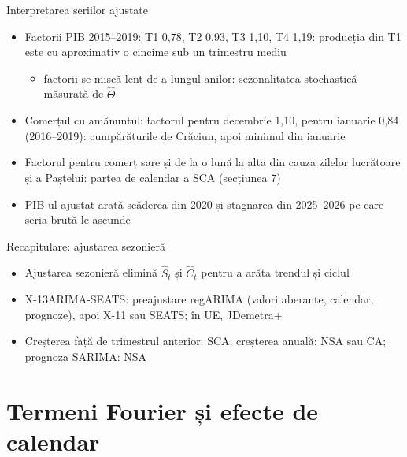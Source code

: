 \begin{frame}{Interpretarea seriilor ajustate}
\itemsize{\footnotesize}
\begin{itemize}
    \item Factorii PIB 2015--2019: T1 0{,}78, T2 0{,}93, T3 1{,}10, T4 1{,}19: producția din T1 este cu aproximativ o cincime sub un trimestru mediu
    \begin{itemize}
        \item factorii se mișcă lent de-a lungul anilor: sezonalitatea stochastică măsurată de $\hat\Theta$
    \end{itemize}
    \item Comerțul cu amănuntul: factorul pentru decembrie 1{,}10, pentru ianuarie 0{,}84 (2016--2019): cumpărăturile de Crăciun, apoi minimul din ianuarie
    \item Factorul pentru comerț sare și de la o lună la alta din cauza zilelor lucrătoare și a Paștelui: partea de calendar a SCA (secțiunea 7)
    \item PIB-ul ajustat arată scăderea din 2020 și stagnarea din 2025--2026 pe care seria brută le ascunde
\end{itemize}
\end{frame}

\begin{frame}{Recapitulare: ajustarea sezonieră}
\itemsize{\small}
\begin{itemize}
    \item Ajustarea sezonieră elimină $\hat S_t$ și $\hat C_t$ pentru a arăta trendul și ciclul
    \item X-13ARIMA-SEATS: preajustare regARIMA (valori aberante, calendar, prognoze), apoi X-11 sau SEATS; în UE, JDemetra+
    \item Creșterea față de trimestrul anterior: SCA; creșterea anuală: NSA sau CA; prognoza SARIMA: NSA
\end{itemize}
\end{frame}


\section{Termeni Fourier și efecte de calendar}

